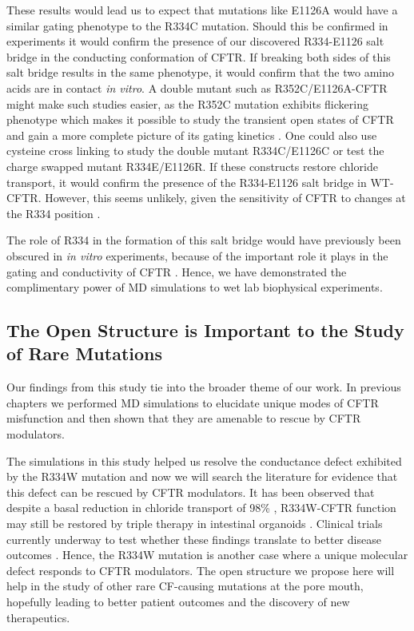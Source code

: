These results would lead us to expect that mutations like E1126A would have a similar gating phenotype to the R334C mutation. Should this be confirmed in experiments it would confirm the presence of our discovered R334-E1126 salt bridge in the conducting conformation of CFTR. If breaking both sides of this salt bridge results in the same phenotype, it would confirm that the two amino acids are in contact \textit{in vitro}. A double mutant such as R352C/E1126A-CFTR might make such studies easier, as the R352C mutation exhibits flickering phenotype which makes it possible to study the transient open states of CFTR and gain a more complete picture of its gating kinetics \cite{csanady2017, zhang2017b}. One could also use cysteine cross linking to study the double mutant R334C/E1126C or test the charge swapped mutant R334E/E1126R. If these constructs restore chloride transport, it would confirm the presence of the R334-E1126 salt bridge in WT-CFTR. However, this seems unlikely, given the sensitivity of CFTR to changes at the R334 position \cite{gong2004}. 

The role of R334 in the formation of this salt bridge would have previously been obscured in \textit{in vitro} experiments, because of the important role it plays in the gating and conductivity of CFTR \cite{gong2003, gong2004}. Hence, we have demonstrated the complimentary power of MD simulations to wet lab biophysical experiments. %

\subsection{The Open Structure is Important to the Study of Rare Mutations}

Our findings from this study tie into the broader theme of our work. In previous chapters we performed MD simulations to elucidate unique modes of CFTR misfunction and then shown that they are amenable to rescue by CFTR modulators. 

The simulations in this study helped us resolve the conductance defect exhibited by the R334W mutation and now we will search the literature for evidence that this defect can be rescued by CFTR modulators. It has been observed that despite a basal reduction in chloride transport of 98\% \cite{han2018}, R334W-CFTR function may still be restored by triple therapy in intestinal organoids \cite{vanwilligen2019}. Clinical trials currently underway to test whether these findings translate to better disease outcomes \cite{R334W_Euro_CF_trial}. Hence, the R334W mutation is another case where a unique molecular defect responds to CFTR modulators. The open structure we propose here will help in the study of other rare CF-causing mutations at the pore mouth, hopefully leading to better patient outcomes and the discovery of new therapeutics.


